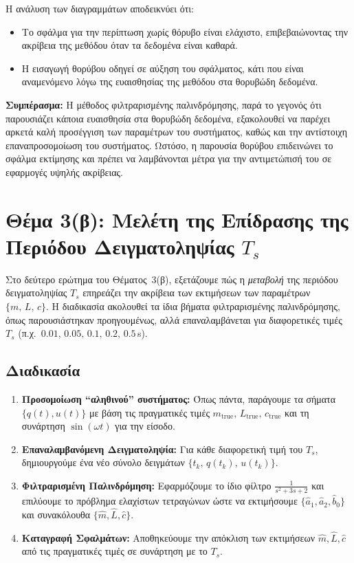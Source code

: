 \documentclass[a4paper,12pt]{report}
\newcommand{\en}{\selectlanguage{english}}
\newcommand{\gr}{\selectlanguage{greek}}
\begin{document}
Η ανάλυση των διαγραμμάτων αποδεικνύει ότι:
\begin{itemize}
    \item Το σφάλμα για την περίπτωση χωρίς θόρυβο είναι ελάχιστο, επιβεβαιώνοντας την ακρίβεια της μεθόδου όταν τα δεδομένα είναι καθαρά.
    \item Η εισαγωγή θορύβου οδηγεί σε αύξηση του σφάλματος, κάτι που είναι αναμενόμενο λόγω της ευαισθησίας της μεθόδου στα θορυβώδη δεδομένα.
\end{itemize}

\noindent
\textbf{Συμπέρασμα:} Η μέθοδος φιλτραρισμένης παλινδρόμησης, παρά το γεγονός ότι παρουσιάζει κάποια ευαισθησία στα θορυβώδη δεδομένα, εξακολουθεί να παρέχει αρκετά καλή προσέγγιση των παραμέτρων του συστήματος, καθώς και την αντίστοιχη επαναπροσομοίωση του συστήματος. Ωστόσο, η παρουσία θορύβου επιδεινώνει το σφάλμα εκτίμησης και πρέπει να λαμβάνονται μέτρα για την αντιμετώπισή του σε εφαρμογές υψηλής ακρίβειας.

\section{Θέμα 3(β): Μελέτη της Επίδρασης της Περιόδου Δειγματοληψίας \(T_s\)}

Στο δεύτερο ερώτημα του Θέματος~3(β), εξετάζουμε πώς η \emph{μεταβολή} της περιόδου δειγματοληψίας \(T_s\) επηρεάζει την ακρίβεια των εκτιμήσεων των παραμέτρων \(\{m,\,L,\,c\}\). Η διαδικασία ακολουθεί τα ίδια βήματα φιλτραρισμένης παλινδρόμησης, όπως παρουσιάστηκαν προηγουμένως, αλλά επαναλαμβάνεται για διαφορετικές τιμές \(T_s\) (π.χ.\ \(0.01,\,0.05,\,0.1,\,0.2,\,0.5\)\,\en s\gr).

\subsection*{Διαδικασία}

\begin{enumerate}
    \item \textbf{Προσομοίωση ``αληθινού'' συστήματος:} 
    Όπως πάντα, παράγουμε τα σήματα \(\{q(t),u(t)\}\) με βάση τις πραγματικές τιμές \(m_{\mathrm{true}},\,L_{\mathrm{true}},\,c_{\mathrm{true}}\) και τη συνάρτηση \(\sin(\omega t)\) για την είσοδο.
    \item \textbf{Επαναλαμβανόμενη Δειγματοληψία:} 
    Για κάθε διαφορετική τιμή του \(T_s\), δημιουργούμε ένα νέο σύνολο δειγμάτων \(\bigl\{t_k,\,q(t_k),\,u(t_k)\bigr\}\). 
    \item \textbf{Φιλτραρισμένη Παλινδρόμηση:} 
    Εφαρμόζουμε το ίδιο φίλτρο \(\tfrac{1}{s^2+3s+2}\) και επιλύουμε το πρόβλημα ελαχίστων τετραγώνων ώστε να εκτιμήσουμε \(\{\hat{a}_1,\hat{a}_2,\hat{b}_0\}\) και συνακόλουθα \(\{\hat{m},\hat{L},\hat{c}\}\).
    \item \textbf{Καταγραφή Σφαλμάτων:} 
    Αποθηκεύουμε την απόκλιση των εκτιμήσεων \(\hat{m},\hat{L},\hat{c}\) από τις πραγματικές τιμές σε συνάρτηση με το \(T_s\).
\end{enumerate}
\end{document}
